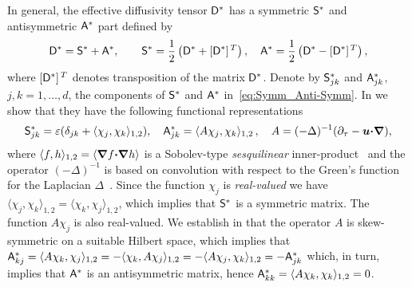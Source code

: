 \documentclass[amsa]{ipart}
\begin{document}
In general, the effective diffusivity tensor $\mathsf{D}^*$ has a symmetric
$\mathsf{S}^*$ and antisymmetric $\mathsf{A}^*$ part defined by 
%
\begin{align}\label{eq:Symm_Anti-Symm}
  \Dm^*=\Sm^*+\Am^*,\qquad
  \Sm^*=\frac{1}{2}\left(\Dm^*+[\Dm^*]^{\,T}\right), \quad
  \Am^*=\frac{1}{2}\left(\Dm^*-[\Dm^*]^{\,T}\right),
\end{align}
%
where $[\mathsf{D}^*]^{\,T}$ denotes transposition of the matrix
$\mathsf{D}^*$. Denote by $\mathsf{S}^*_{jk}$ and $\mathsf{A}^*_{jk}$, $j,k=1,\ldots,d$, the
components of $\mathsf{S}^*$ and $\mathsf{A}^*$ in~\eqref{eq:Symm_Anti-Symm}. In
 we show that they have the following
functional representations~\cite{Pavliotis:PHD_Thesis} 
%
\begin{align}\label{eq:Eff_Diffusivity_Sobolev}
  \Sm^*_{jk}=\varepsilon(\delta_{jk}+\langle\chi_j,\chi_k\rangle_{1,2}),
  \quad
  \Am^*_{jk}=\langle A\chi_j,\chi_k\rangle_{1,2}\,,
  \quad
  A=(-\Delta)^{-1}(\partial_\tau-\vecu \bcdot\bnabla),
\end{align}
%
where $\langle f,h\rangle_{1,2}=\langle\mbox{\boldmath${\nabla}$} f\mbox{\boldmath${\cdot}$}\mbox{\boldmath${\nabla}$} h\rangle$ is a Sobolev-type
\emph{sesquilinear} inner-product~\cite{McOwen:2003:PDE} and the
operator $(-\Delta)^{-1}$ is based on convolution with respect to the
Green's function for the Laplacian $\Delta$~\cite{Stakgold:BVP:2000}. 
Since the function $\chi_j$ is
\emph{real-valued} we have $\langle\chi_j,\chi_k\rangle_{1,2}=\langle\chi_k,\chi_j\rangle_{1,2}$, which implies that
$\mathsf{S}^*$ is a symmetric matrix. The function $A\chi_j$ is also
real-valued. We establish in  that the
operator $A$ is skew-symmetric on a suitable Hilbert space, which
implies that
$\mathsf{A}^*_{kj}=\langle A\chi_k,\chi_j\rangle_{1,2}=-\langle\chi_k,A\chi_j\rangle_{1,2}=-\langle A\chi_j,\chi_k\rangle_{1,2}=-\mathsf{A}^*_{jk}$
which, in turn, implies that $\mathsf{A}^*$ is an antisymmetric matrix, hence
$\mathsf{A}^*_{kk}=\langle A\chi_k,\chi_k\rangle_{1,2}=0$.  
\end{document}
